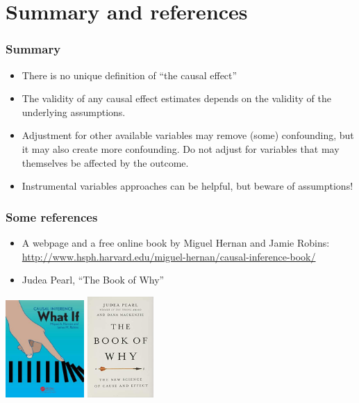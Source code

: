\documentclass[10pt,dvipsnames,t,handout%
,aspectratio=169%
]{beamer}%
\begin{document}
\section{Summary and references}
\begin{frame}
\frametitle{Summary}
\begin{itemize}
\item There is no unique definition of ``the causal effect'' 
\item The validity of any causal effect estimates depends on the validity of the underlying assumptions.
\item Adjustment for other available variables may remove (some) confounding, but it may also create more confounding. \alert{Do not adjust for variables that may themselves be affected by the outcome.}   
\item Instrumental variables approaches can be helpful, but beware of assumptions! 
\end{itemize}
\end{frame}



\begin{frame}
\setlength{\textwidth}{1.2\textwidth}
\frametitle{Some references}
\begin{itemize}
\item A webpage and a free online book by Miguel Hernan and Jamie Robins: 
\href{http://www.hsph.harvard.edu/miguel-hernan/causal-inference-book/}{http://www.hsph.harvard.edu/miguel-hernan/causal-inference-book/}
\item Judea Pearl, ``The Book of Why'' 
\end{itemize}
\includegraphics[width=3cm]{whatif}
\includegraphics[width=2.5cm]{why}
\end{frame}
\end{document}
